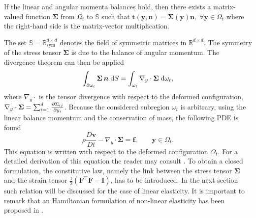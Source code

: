 \begin{theorem}
If the linear and angular momenta balances hold, then there exists a matrix-valued function $\bm{\Sigma}$ from $\Omega_t$ to $\mathbb{S}$ such
that $\bm{t}(\bm{y}, \bm{n}) = \bm{\Sigma}(\bm{y}) \bm{n}, \; \forall \bm{y} \in \Omega_t$ where the right-hand side is the matrix-vector multiplication.
\end{theorem}
The set $\mathbb{S}=\mathbb{R}^{d\times d}_{\mathrm{sym}}$ denotes the field of symmetric matrices in $\mathbb{R}^{d\times d}$. The symmetry of the stress tensor $\bm{\Sigma}$ is due to the balance of angular momentum. The divergence theorem can then be applied
\begin{equation*}
\int_{\partial \omega_t} \bm{\Sigma} \, \bm{n} \d{S} = \int_{\omega_t} \nabla_y \cdot\bm{\Sigma} \d{\omega_t},
\end{equation*}
where $\nabla_y \cdot$ is the tensor divergence with respect to the deformed configuration, $\nabla_y \cdot\bm{\Sigma} = \sum_{i=1}^{d}\diffp{\Sigma_{ij}}{y_i}$.
Because the considered subregion $\omega_t$ is arbitrary, using the linear balance momentum and the conservation of mass, the following PDE is found
\begin{equation*}
	\rho \frac{D\bm{v}}{Dt} - \nabla_y \cdot{\bm{\Sigma}} = \bm{f}, \qquad \bm{y} \in \Omega_t.
\end{equation*}
This equation is written with respect to the deformed configuration $\Omega_t$. For a detailed derivation of this equation the reader may consult \cite[Chapter 4]{abeyaratne2012notes}. To obtain a closed formulation, the constitutive law, namely the link between the stress tensor $\bm{\Sigma}$ and the strain tensor $\frac{1}{2} (\bm{F}^\top \bm{F} - \bm{I})$, has to be introduced. In the next section such relation will be discussed for the case of linear elasticity. It is important to remark that an Hamiltonian formulation of non-linear elasticity has been proposed in \cite[Chapter 3]{marsden1981lectures}.

